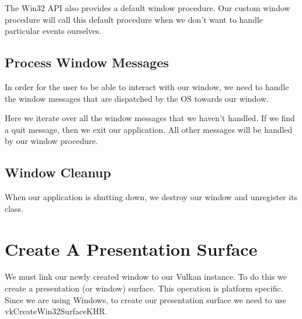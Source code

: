 The Win32 API also provides a default window procedure.
Our custom window procedure will call this default procedure when we don't want
to handle particular events ourselves.

\begin{minipage}{\linewidth}{\noindent}
    
\end{minipage}

\subsection{Process Window Messages}

In order for the user to be able to interact with our window, we need to handle
the window messages that are dispatched by the OS towards our window.

\begin{minipage}{\linewidth}{\noindent}
    
\end{minipage}

Here we iterate over all the window messages that we haven't handled.
If we find a quit message, then we exit our application.
All other messages will be handled by our window procedure.

\subsection{Window Cleanup}

When our application is shutting down, we destroy our window and unregister
its class.

\begin{minipage}{\linewidth}{\noindent}
    
\end{minipage}

\section{Create A Presentation Surface}

We must link our newly created window to our Vulkan instance.
To do this we create a presentation (or window) surface.
This operation is platform specific.
Since we are using Windows, to create our presentation surface we need
to use vkCreateWin32SurfaceKHR.

